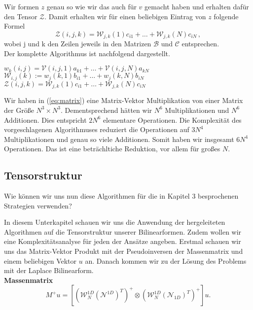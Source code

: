 Wir formen $z$ genau so wie wir das auch für $v$ gemacht haben und erhalten dafür den Tensor $\mathcal{Z}$. Damit erhalten wir für einen beliebigen Eintrag von $z$ folgende Formel
\begin{equation*}
\mathcal{Z}(i,j,k) = \mathcal{W}_{j,k}(1) c_{i1}  + \dots +  \mathcal{W}_{j,k}(N) c_{iN} \, ,
\end{equation*}
wobei j und k den Zeilen jeweils in den Matrizen $\mathcal{B}$ und $\mathcal{C}$ entsprechen. \\
Der komplette Algorithmus ist nachfolgend dargestellt.
\newpage
\begin{mdframed}[backgroundcolor=blue!3] 
\begin{algorithmic}
			\State $w_{k}(i,j) = \mathcal{V}(i,j,1)a_{k1} + \dots + \mathcal{V}(i,j,N)a_{kN}$
		\EndFor
	\EndFor
\EndFor
{}
			\State $\mathcal{W}_{i,j} (k):= w_j(k,1) b_{i1} + \dots + w_j(k,N) b_{iN}$
		\EndFor
	\EndFor
\EndFor
{}
			\State $\mathcal{Z}(i,j,k) = \mathcal{W}_{j,k}(1) c_{i1}  + \dots +  \mathcal{W}_{j,k}(N) c_{iN}$ 
		\EndFor
	\EndFor
\EndFor
\end{algorithmic}
\end{mdframed}

 
Wir haben in (\ref{eq:matrix}) eine Matrix-Vektor Multiplikation von einer Matrix der Größe $N^3 \times N^3$. Dementsprechend hätten wir $N^{6}$ Multiplikationen und $N^6$ Additionen. Dies entspricht $2N^6$ elementare Operationen. Die Komplexität des vorgeschlagenen Algorithmuses reduziert die Operationen auf $3N^{4}$ Multiplikationen und genau so viele Additionen. Somit haben wir insgesamt $6N^4$ Operationen. Das ist eine beträchltiche Reduktion, vor allem für großes $N$.
\newline

\newpage
\subsection{Tensorstruktur}

Wie können wir uns nun diese Algorithmen für die in Kapitel 3 besprochenen Strategien verwenden?

In diesem Unterkapitel schauen wir uns die Anwendung der hergeleiteten Algorithmen auf die Tensorstruktur unserer Bilinearformen. Zudem wollen wir eine Komplexitätsanalyse für jeden der Ansätze angeben. Erstmal schauen wir uns das Matrix-Vektor Produkt mit der Pseudoinversen der Massenmatrix und einem beliebigen Vektor $u$ an. Danach kommen wir zu der Lösung des Problems mit der Laplace Bilinearform. \\
\textbf{Massenmatrix} 
\begin{equation*}
M^{+}u =  [(\mathcal{W}_N^{1D} (\mathcal{N}^{1D})^T)^+ \otimes (\mathcal{W}_N^{1D} (\mathcal{N}_{1D})^T)^+]u.
\end{equation*}



